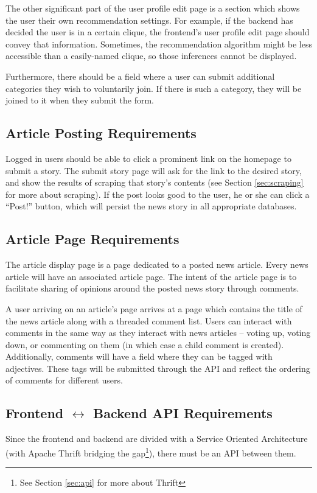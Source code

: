 \documentclass[11pt,letterpaper]{article}
\begin{document}
The other significant part of the user profile edit page is a section which shows the user their own recommendation settings.
For example, if the backend has decided the user is in a certain clique, the frontend's user profile edit page should convey that information.
Sometimes, the recommendation algorithm might be less accessible than a easily-named clique, so those inferences cannot be displayed.

Furthermore, there should be a field where a user can submit additional categories they wish to voluntarily join. If there is such a category, they will be joined to it when they submit the form.

\subsection{Article Posting Requirements}
Logged in users should be able to click a prominent link on the homepage to submit a story.
The submit story page will ask for the link to the desired story, and show the results of scraping that story's contents (see Section \ref{sec:scraping} for more about scraping).
If the post looks good to the user, he or she can click a ``Post!'' button, which will persist the news story in all appropriate databases.

\subsection{Article Page Requirements}
The article display page is a page dedicated to a posted news article. Every news article will have an associated article page.
The intent of the article page is to facilitate sharing of opinions around the posted news story through comments.

A user arriving on an article's page arrives at a page which contains the title of the news article along with a threaded comment list.
Users can interact with comments in the same way as they interact with news articles -- voting up, voting down, or commenting on them (in which case a child comment is created). Additionally, comments will have a field where they can be tagged with adjectives. These tags will be submitted through the API and reflect the ordering of comments for different users.

\subsection{Frontend $\leftrightarrow$ Backend API Requirements}
Since the frontend and backend are divided with a Service Oriented Architecture (with Apache Thrift bridging the gap\footnote{See Section \ref{sec:api} for more about Thrift}), there must be an API between them.
\end{document}
